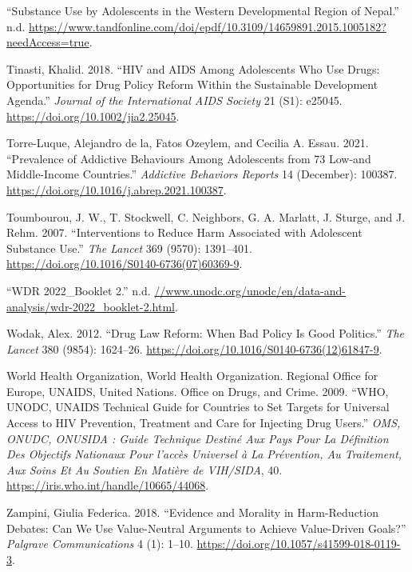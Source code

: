 \documentclass[
  letterpaper,
  DIV=11,
  numbers=noendperiod]{scrartcl}
\newlength{\cslhangindent}
\newenvironment{CSLReferences}[2] %
 {\begin{list}{}{%
  \setlength{\itemindent}{0pt}
  \setlength{\leftmargin}{0pt}
  \setlength{\parsep}{0pt}
  \ifodd #1
   \setlength{\leftmargin}{\cslhangindent}
   \setlength{\itemindent}{-1\cslhangindent}
  \fi
  \setlength{\itemsep}{#2\baselineskip}}}
 {\end{list}}
\begin{document}
\begin{CSLReferences}{1}{0}
{``Substance Use by Adolescents in the Western Developmental Region of
Nepal.''} n.d.
\url{https://www.tandfonline.com/doi/epdf/10.3109/14659891.2015.1005182?needAccess=true}.

Tinasti, Khalid. 2018. {``HIV and AIDS Among Adolescents Who Use Drugs:
Opportunities for Drug Policy Reform Within the Sustainable Development
Agenda.''} \emph{Journal of the International AIDS Society} 21 (S1):
e25045. \url{https://doi.org/10.1002/jia2.25045}.

Torre-Luque, Alejandro de la, Fatos Ozeylem, and Cecilia A. Essau. 2021.
{``Prevalence of Addictive Behaviours Among Adolescents from 73 Low-and
Middle-Income Countries.''} \emph{Addictive Behaviors Reports} 14
(December): 100387. \url{https://doi.org/10.1016/j.abrep.2021.100387}.

Toumbourou, J. W., T. Stockwell, C. Neighbors, G. A. Marlatt, J. Sturge,
and J. Rehm. 2007. {``Interventions to Reduce Harm Associated with
Adolescent Substance Use.''} \emph{The Lancet} 369 (9570): 1391--401.
\url{https://doi.org/10.1016/S0140-6736(07)60369-9}.

{``WDR 2022{\_}Booklet 2.''} n.d.
\href{https:////www.unodc.org/unodc/en/data-and-analysis/wdr-2022_booklet-2.html}{//www.unodc.org/unodc/en/data-and-analysis/wdr-2022\_booklet-2.html}.

Wodak, Alex. 2012. {``Drug Law Reform: When Bad Policy Is Good
Politics.''} \emph{The Lancet} 380 (9854): 1624--26.
\url{https://doi.org/10.1016/S0140-6736(12)61847-9}.

World Health Organization, World Health Organization. Regional Office
for Europe, UNAIDS, United Nations. Office on Drugs, and Crime. 2009.
{``WHO, UNODC, UNAIDS Technical Guide for Countries to Set Targets for
Universal Access to HIV Prevention, Treatment and Care for Injecting
Drug Users.''} \emph{OMS, ONUDC, ONUSIDA : Guide Technique Destiné Aux
Pays Pour La Définition Des Objectifs Nationaux Pour l'accès Universel à
La Prévention, Au Traitement, Aux Soins Et Au Soutien En Matière de
VIH/SIDA}, 40. \url{https://iris.who.int/handle/10665/44068}.

Zampini, Giulia Federica. 2018. {``Evidence and Morality in
Harm-Reduction Debates: Can We Use Value-Neutral Arguments to Achieve
Value-Driven Goals?''} \emph{Palgrave Communications} 4 (1): 1--10.
\url{https://doi.org/10.1057/s41599-018-0119-3}.

\end{CSLReferences}
\end{document}
